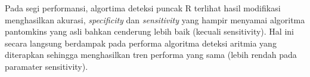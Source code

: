 Pada segi performansi, algortima deteksi puncak R terlihat hasil modifikasi menghasilkan akurasi, \textit{specificity} dan \textit{sensitivity} yang hampir menyamai algoritma pantomkins yang asli bahkan cenderung lebih baik (kecuali sensitivity). Hal ini secara langsung berdampak pada performa algoritma deteksi aritmia yang diterapkan sehingga menghasilkan tren performa yang sama (lebih rendah pada paramater sensitivity).
